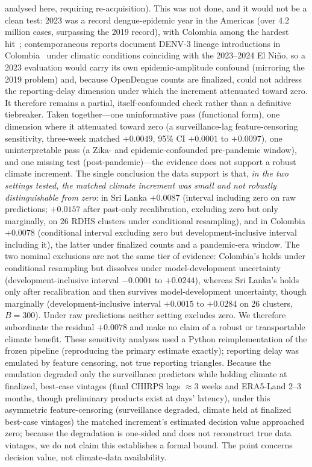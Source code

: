 \documentclass[11pt,a4paper]{article}
\begin{document}
analysed here, requiring re-acquisition). This was not done, and it would not be a clean test: 2023 was a record dengue-epidemic year in the Americas (over 4.2 million cases, surpassing the 2019 record), with Colombia among the hardest hit~\cite{PAHO2023}; contemporaneous reports document DENV-3 lineage introductions in Colombia~\cite{ValleDelCauca2024} under climatic conditions coinciding with the 2023--2024 El Ni\~no, so a 2023 evaluation would carry its own epidemic-amplitude confound (mirroring the 2019 problem) and, because OpenDengue counts are finalized, could not address the reporting-delay dimension under which the increment attenuated toward zero. It therefore remains a partial, itself-confounded check rather than a definitive tiebreaker. Taken together---one uninformative pass (functional form), one dimension where it attenuated toward zero (a surveillance-lag feature-censoring sensitivity, three-week matched $+0.0049$, 95\% CI $+0.0001$ to $+0.0097$), one uninterpretable pass (a Zika- and epidemic-confounded pre-pandemic window), and one missing test (post-pandemic)---the evidence does not support a robust climate increment. The single conclusion the data support is that, \emph{in the two settings tested, the matched climate increment was small and not robustly distinguishable from zero}: in Sri Lanka $+0.0087$ (interval including zero on raw predictions; $+0.0157$ after past-only recalibration, excluding zero but only marginally, on 26 RDHS clusters under conditional resampling), and in Colombia $+0.0078$ (conditional interval excluding zero but development-inclusive interval including it), the latter under finalized counts and a pandemic-era window. The two nominal exclusions are not the same tier of evidence: Colombia's holds under conditional resampling but dissolves under model-development uncertainty (development-inclusive interval $-0.0001$ to $+0.0244$), whereas Sri Lanka's holds only after recalibration and then survives model-development uncertainty, though marginally (development-inclusive interval $+0.0015$ to $+0.0284$ on 26 clusters, $B=300$). Under raw predictions neither setting excludes zero. We therefore subordinate the residual $+0.0078$ and make no claim of a robust or transportable climate benefit. These sensitivity analyses used a Python reimplementation of the frozen pipeline (reproducing the primary estimate exactly); reporting delay was emulated by feature censoring, not true reporting triangles. Because the emulation degraded only the surveillance predictors while holding climate at finalized, best-case vintages (final CHIRPS lags $\approx$3 weeks and ERA5-Land 2--3 months, though preliminary products exist at days' latency), under this asymmetric feature-censoring (surveillance degraded, climate held at finalized best-case vintages) the matched increment's estimated decision value approached zero; because the degradation is one-sided and does not reconstruct true data vintages, we do not claim this establishes a formal bound. The point concerns decision value, not climate-data availability.
\end{document}
